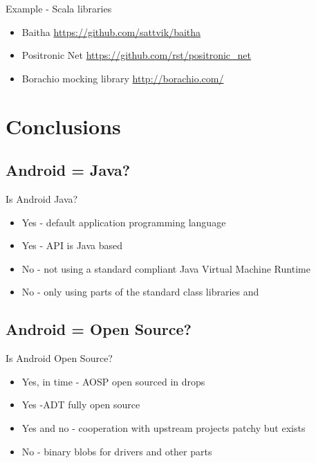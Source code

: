 \documentclass[aspectratio=169]{beamer}
\newcommand{\surl}[1] {{\tiny \url{#1}}}
\begin{document}
    \begin{frame}{Example - Scala libraries}
      \begin{itemize}
       \item Baitha \surl{https://github.com/sattvik/baitha}
       \item Positronic Net \surl{https://github.com/rst/positronic_net}
       \item Borachio mocking library \surl{http://borachio.com/}
      \end{itemize}
    \end{frame}

\section{Conclusions}

  \subsection{Android = Java?}
    \begin{frame}{Is Android Java?}
      \begin{itemize}
      \item Yes - default application programming language
      \item Yes - API is Java based
      \item No - not using a standard compliant Java Virtual Machine Runtime
      \item No - only using parts of the standard class libraries and 
      \end{itemize}
    \end{frame}

  \subsection{Android = Open Source?}
    \begin{frame}{Is Android Open Source?}
      \begin{itemize}
       \item Yes, in time - AOSP open sourced in drops
       \item Yes -ADT fully open source
       \item Yes and no - cooperation with upstream projects patchy but exists
       \item No - binary blobs for drivers and other parts
      \end{itemize}
    \end{frame}
\end{document}
